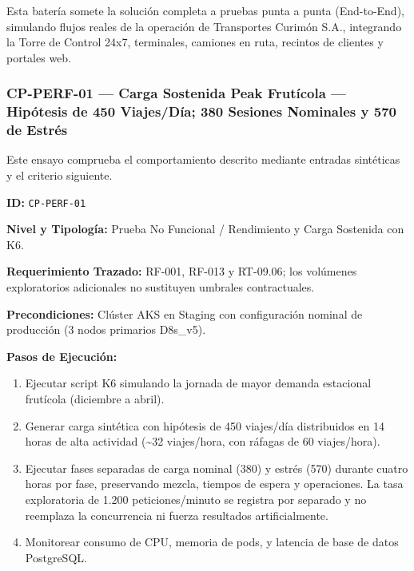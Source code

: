 Esta batería somete la solución completa a pruebas punta a punta (End-to-End), simulando flujos reales de la operación de Transportes Curimón S.A., integrando la Torre de Control 24x7, terminales, camiones en ruta, recintos de clientes y portales web.






\subsubsection*{CP-PERF-01 — Carga Sostenida Peak Frutícola — Hipótesis de 450 Viajes/Día; 380 Sesiones Nominales y 570 de Estrés}\label{sec:9-cp-perf-01}
Este ensayo comprueba el comportamiento descrito mediante entradas sintéticas y el criterio siguiente.

\par\noindent \textbf{ID:} \texttt{CP-\allowbreak{}PERF-\allowbreak{}01}\par
\par\noindent \textbf{Nivel y Tipología:} Prueba No Funcional / Rendimiento y Carga Sostenida con K6.\par
\par\noindent \textbf{Requerimiento Trazado:} RF-001, RF-013 y RT-09.06; los volúmenes exploratorios adicionales no sustituyen umbrales contractuales.\par
\par\noindent \textbf{Precondiciones:} Clúster AKS en Staging con configuración nominal de producción (3 nodos primarios D8s\_v5).\par
\par\noindent \textbf{Pasos de Ejecución:}\par
\begin{enumerate}
\item Ejecutar script K6 simulando la jornada de mayor demanda estacional frutícola (diciembre a abril).
\item Generar carga sintética con hipótesis de 450 viajes/día distribuidos en 14 horas de alta actividad (\textasciitilde{}32 viajes/hora, con ráfagas de 60 viajes/hora).
\item Ejecutar fases separadas de carga nominal (380) y estrés (570) durante cuatro horas por fase, preservando mezcla, tiempos de espera y operaciones. La tasa exploratoria de 1.200 peticiones/minuto se registra por separado y no reemplaza la concurrencia ni fuerza resultados artificialmente.
\item Monitorear consumo de CPU, memoria de pods, y latencia de base de datos PostgreSQL.
\end{enumerate}

